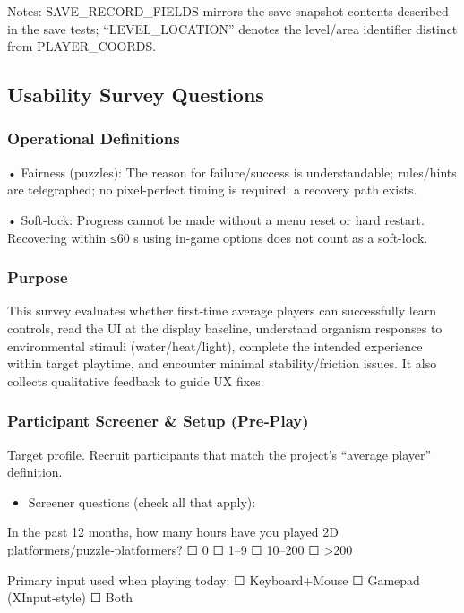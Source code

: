 \documentclass[12pt, titlepage]{article}
\begin{document}
Notes: SAVE\_RECORD\_FIELDS mirrors the save-snapshot contents described in the save tests; “LEVEL\_LOCATION” denotes the level/area identifier distinct from PLAYER\_COORDS.

\subsection{Usability Survey Questions}

\subsubsection{Operational Definitions}

• Fairness (puzzles): The reason for failure/success is understandable; rules/hints are telegraphed; no pixel-perfect timing is required; a recovery path exists.

• Soft-lock: Progress cannot be made without a menu reset or hard restart. Recovering within ≤60 s using in-game options does not count as a soft-lock.

\subsubsection{Purpose}

This survey evaluates whether first‑time average players can successfully learn controls, read the UI at the display baseline, understand organism responses to environmental stimuli (water/heat/light), complete the intended experience within target playtime, and encounter minimal stability/friction issues. It also collects qualitative feedback to guide UX fixes.

\subsubsection{Participant Screener & Setup (Pre‑Play)}

Target profile. Recruit participants that match the project’s “average player” definition.

\begin{itemize}
  \item Screener questions (check all that apply):
\end{itemize}

In the past 12 months, how many hours have you played 2D platformers/puzzle‑platformers?
 ☐ 0 ☐ 1–9 ☐ 10–200 ☐ >200

Primary input used when playing today: ☐ Keyboard+Mouse ☐ Gamepad (XInput‑style) ☐ Both
\end{document}

